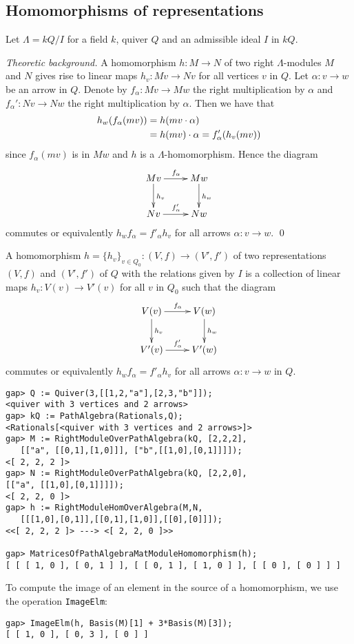 \documentclass{amsart}
\renewcommand{\L}{\Lambda}
\theoremstyle{definition}
\newcommand{\code}[1]{\texttt{#1}}
\theoremstyle{theoretic}
\newenvironment{theoback}
{\medskip\small\textit{Theoretic background.} }
{\qed\par\medskip}
\begin{document}
\subsection{Homomorphisms of representations}
Let $\L = kQ/I$ for a field $k$, quiver $Q$ and an admissible ideal
$I$ in $kQ$.  

\begin{theoback}
A homomorphism $h\colon M\to N$ of two right $\L$-modules $M$ and $N$
gives rise to linear maps $h_v\colon Mv\to Nv$ for all vertices $v$ in
$Q$.  Let $\alpha\colon v\to w$ be an arrow in $Q$.  Denote by
$f_\alpha\colon Mv\to Mw$ the right multiplication by $\alpha$ and
$f_\alpha'\colon Nv\to Nw$ the right multiplication by $\alpha$.
Then we have that
\begin{align}
h_w(f_\alpha(mv)) & = h(mv\cdot \alpha)\notag\\
& = h(mv)\cdot\alpha = f'_\alpha(h_v(mv))\notag
\end{align}
since $f_\alpha(mv)$ is in $Mw$ and $h$ is a $\L$-homomorphism.  Hence
the diagram 
\[\xymatrix{
Mv\ar[d]^{h_v}\ar[r]^{f_\alpha} &  Mw\ar[d]^{h_w}\\
Nv\ar[r]^{f'_\alpha} & Nw
}\]
commutes or equivalently $h_wf_\alpha = f'_\alpha h_v$ for all arrows
$\alpha\colon v\to w$.
\end{theoback}

A homomorphism $h=\{h_v\}_{v\in Q_0}\colon (V,f)\to (V',f')$ of two
representations $(V,f)$ and $(V',f')$ of $Q$ with the relations given
by $I$ is a collection of linear maps $h_v\colon V(v)\to V'(v)$ for
all $v$ in $Q_0$ such that the diagram 
\[\xymatrix{
V(v)\ar[d]^{h_v}\ar[r]^{f_\alpha} &  V(w)\ar[d]^{h_w}\\
V'(v)\ar[r]^{f'_\alpha} & V'(w)
}\]
commutes or equivalently $h_wf_\alpha = f'_\alpha h_v$ for all arrows
$\alpha\colon v\to w$ in $Q$.  

\begin{verbatim}
gap> Q := Quiver(3,[[1,2,"a"],[2,3,"b"]]);
<quiver with 3 vertices and 2 arrows>
gap> kQ := PathAlgebra(Rationals,Q);
<Rationals[<quiver with 3 vertices and 2 arrows>]>
gap> M := RightModuleOverPathAlgebra(kQ, [2,2,2], 
   [["a", [[0,1],[1,0]]], ["b",[[1,0],[0,1]]]]);
<[ 2, 2, 2 ]>
gap> N := RightModuleOverPathAlgebra(kQ, [2,2,0], 
[["a", [[1,0],[0,1]]]]);                     
<[ 2, 2, 0 ]>
gap> h := RightModuleHomOverAlgebra(M,N, 
   [[[1,0],[0,1]],[[0,1],[1,0]],[[0],[0]]]);             
<<[ 2, 2, 2 ]> ---> <[ 2, 2, 0 ]>>

gap> MatricesOfPathAlgebraMatModuleHomomorphism(h);                                            
[ [ [ 1, 0 ], [ 0, 1 ] ], [ [ 0, 1 ], [ 1, 0 ] ], [ [ 0 ], [ 0 ] ] ]
\end{verbatim}
To compute the image of an element in the source of a homomorphism,
we use the operation \code{ImageElm}:
\begin{verbatim}
gap> ImageElm(h, Basis(M)[1] + 3*Basis(M)[3]);
[ [ 1, 0 ], [ 0, 3 ], [ 0 ] ]
\end{verbatim}
\end{document}
